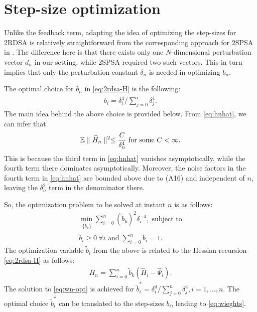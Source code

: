 \section{Step-size optimization}
Unlike the feedback term, adapting the idea of optimizing the step-sizes for 2RDSA is relatively straightforward from the corresponding approach for 2SPSA in \cite{spall-jacobian}. The difference here is that there exists only one $N$-dimensional perturbation vector $d_n$ in our setting, while 2SPSA required two such vectors. This in turn implies that only the perturbation constant $\delta_n$ is needed in optimizing $b_n$.

The optimal choice for $b_n$ in \eqref{eq:2rdsa-H} is the following:
\begin{align}
\label{eq:wieghts}
b_i  = \delta_i^{4}/\sum\limits_{j=0}^{i} \delta_j^{4}.
\end{align}
The main idea behind the above choice is provided below.
From \eqref{eq:hnhat}, we can infer that
\begin{align*}
\mathbb{E} \parallel \widehat H_n \parallel^2 \le \dfrac{C}{\delta_n^4} \text{ for some } C<\infty. 
\end{align*} 
This is because the third term in \eqref{eq:hnhat} vanishes asymptotically, while the fourth term there dominates asymptotically. Moreover, the noise factors in the fourth term in \eqref{eq:hnhat} are bounded above due to (A16) and independent of $n$, leaving the $\delta_n^2$ term in the denominator there. 

So, the optimization problem to be solved at instant $n$ is as follows:
\begin{align}
\min_{ \{\tilde b_k\} } \sum \limits_{i=0}^{n} (\tilde b_k)^2 \delta_i^{-4}, \text{ subject to} \label{eq:wn-opt}\\
\tilde b_i \geq 0 ~\forall i \text{ and }\sum \limits_{i=0}^{n} \tilde b_i = 1.
\end{align}
The optimization variable $\tilde b_i$ from the above is related to the Hessian recursion \eqref{eq:2rdsa-H} as follows:
\begin{align}
\label{eq:hess}
\overline H_n = \sum\limits_{i=0}^{n} \tilde b_k(\widehat H_i -\widehat \Psi_i).
\end{align}
The solution to \eqref{eq:wn-opt} is achieved for $\tilde b_i^* = \delta_i^{4}/\sum \limits_{j=0}^{n} \delta_j^{4}, i=1,\ldots,n$. The optimal choice $\tilde b_i^*$ can be translated to the step-sizes $b_i$, leading to \eqref{eq:wieghts}.

